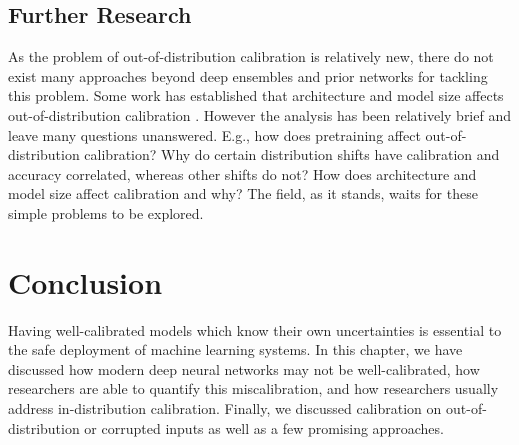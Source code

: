 \documentclass{article}
\begin{document}
\subsection{Further Research} %
As the problem of out-of-distribution calibration is relatively new, there do not exist many approaches beyond deep ensembles and prior networks for tackling this problem. Some work has established that architecture and model size affects out-of-distribution calibration \cite{minderer2021revisiting}. However the analysis has been relatively brief and leave many questions unanswered. E.g., how does pretraining affect out-of-distribution calibration? Why do certain distribution shifts have calibration and accuracy correlated, whereas other shifts do not? How does architecture and model size affect calibration and why? The field, as it stands, waits for these simple problems to be explored.

\section{Conclusion}
Having well-calibrated models which know their own uncertainties is essential to the safe deployment of machine learning systems. In this chapter, we have discussed how modern deep neural networks may not be well-calibrated, how researchers are able to quantify this miscalibration, and how researchers usually address in-distribution calibration. Finally, we discussed calibration on out-of-distribution or corrupted inputs as well as a few promising approaches.



\end{document}
